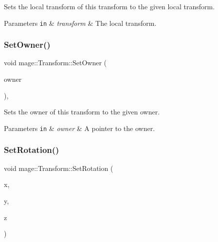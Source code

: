 Sets the local transform of this transform to the given local transform.


\begin{DoxyParams}[1]{Parameters}
\mbox{\tt in}  & {\em transform} & The local transform. \\
\hline
\end{DoxyParams}
\mbox{\label{classmage_1_1_transform_a6bc2db67891b193375d5b79cab4c223a}} 
\subsubsection{\texorpdfstring{Set\+Owner()}{SetOwner()}}
{\footnotesize\ttfamily void mage\+::\+Transform\+::\+Set\+Owner (\begin{DoxyParamCaption}\item[{\mbox{\hyperlink{classmage_1_1_proxy_ptr}{Proxy\+Ptr}}$<$ \mbox{\hyperlink{classmage_1_1_node}{Node}} $>$}]{owner }\end{DoxyParamCaption})\hspace{0.3cm}{\ttfamily [private]}, {\ttfamily [noexcept]}}

Sets the owner of this transform to the given owner.


\begin{DoxyParams}[1]{Parameters}
\mbox{\tt in}  & {\em owner} & A pointer to the owner. \\
\hline
\end{DoxyParams}
\mbox{\label{classmage_1_1_transform_ad4c49c5298d68f3945698ba88e461145}} 
\subsubsection{\texorpdfstring{Set\+Rotation()}{SetRotation()}\hspace{0.1cm}{\footnotesize\ttfamily [1/3]}}
{\footnotesize\ttfamily void mage\+::\+Transform\+::\+Set\+Rotation (\begin{DoxyParamCaption}\item[{\mbox{\hyperlink{namespacemage_aa97e833b45f06d60a0a9c4fc22ae02c0}{F32}}}]{x,  }\item[{\mbox{\hyperlink{namespacemage_aa97e833b45f06d60a0a9c4fc22ae02c0}{F32}}}]{y,  }\item[{\mbox{\hyperlink{namespacemage_aa97e833b45f06d60a0a9c4fc22ae02c0}{F32}}}]{z }\end{DoxyParamCaption})\hspace{0.3cm}{\ttfamily [noexcept]}}

